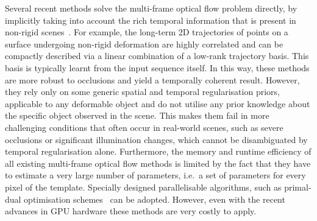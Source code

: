 Several recent methods solve the multi-frame optical flow problem directly, by 
implicitly taking into account the rich temporal information that is present in 
non-rigid scenes~\cite{irani2002multi,torresani2001tracking,torresani2002space,%
tomasi2012dense,ricco2013video,garg2013variational}. 
For example, the long-term 2D trajectories of points on a surface undergoing
non-rigid  deformation are highly correlated and can be compactly described
via a linear combination of a low-rank trajectory basis. 
This basis is typically learnt from the input sequence itself. In 
this way, these methods are more robust to occlusions and yield a temporally coherent 
result. However, they rely only on some generic spatial and temporal regularisation 
priors, applicable to any deformable object and do not utilise any prior knowledge 
about the specific object observed in the scene. This makes them fail in more challenging 
conditions that often occur in real-world scenes, such as severe occlusions or 
significant illumination changes, which cannot be disambiguated by temporal
regularisation alone.
Furthermore, the memory and runtime efficiency of all existing multi-frame optical 
flow methods is limited by the fact that they have to estimate a very large number 
of parameters, i.e.~a set of parameters for every pixel of the template.
Specially designed parallelisable algorithms, such as primal-dual optimisation
schemes~\cite{wedel2009improved,garg2013variational} 
can be adopted. However, even with the recent advances in GPU hardware these
methods are very costly to apply.

